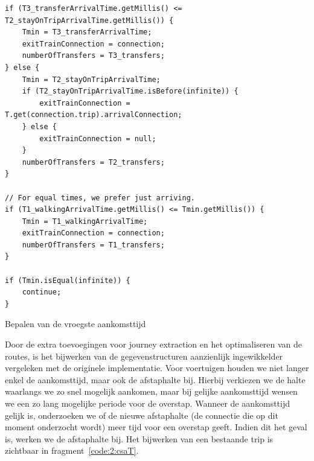\begin{listing}[htb]
\begin{verbatim}
if (T3_transferArrivalTime.getMillis() <= T2_stayOnTripArrivalTime.getMillis()) {
	Tmin = T3_transferArrivalTime;
	exitTrainConnection = connection;
	numberOfTransfers = T3_transfers;
} else {
	Tmin = T2_stayOnTripArrivalTime;
	if (T2_stayOnTripArrivalTime.isBefore(infinite)) {
		exitTrainConnection = T.get(connection.trip).arrivalConnection;
	} else {
		exitTrainConnection = null;
	}
	numberOfTransfers = T2_transfers;
}

// For equal times, we prefer just arriving.
if (T1_walkingArrivalTime.getMillis() <= Tmin.getMillis()) {
	Tmin = T1_walkingArrivalTime;
	exitTrainConnection = connection;
	numberOfTransfers = T1_transfers;
}

if (Tmin.isEqual(infinite)) {
	continue;
}
		\end{verbatim}
		\caption[CSA: Bepalen van vroegste aankomsttijd]{Bepalen van de vroegste aankomsttijd}
		\label{code:2:csaMin}
\end{listing}

Door de extra toevoegingen voor journey extraction en het optimaliseren van de routes, is het bijwerken van de gegevenstructuren aanzienlijk ingewikkelder vergeleken met de originele implementatie. Voor voertuigen houden we niet langer enkel de aankomsttijd, maar ook de afstaphalte bij. Hierbij verkiezen we de halte waarlangs we zo snel mogelijk aankomen, maar bij gelijke aankomsttijd wensen we een zo lang mogelijke periode voor de overstap. Wanneer de aankomsttijd gelijk is, onderzoeken we of de nieuwe afstaphalte (de connectie die op dit moment onderzocht wordt) meer tijd voor een overstap geeft. Indien dit het geval is, werken we de afstaphalte bij. Het bijwerken van een bestaande trip is zichtbaar in fragment~\ref{code:2:csaT}.

